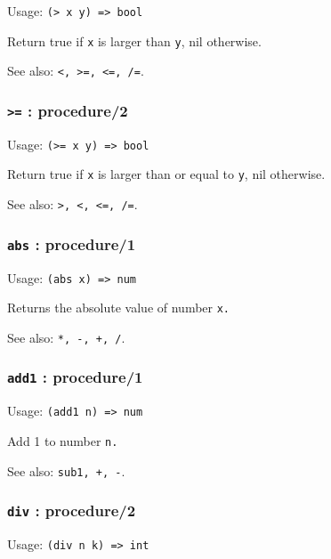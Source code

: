 \documentclass[
]{article}
\newcommand{\passthrough}[1]{#1}
\begin{document}
Usage: \passthrough{\lstinline!(> x y) => bool!}

Return true if \passthrough{\lstinline!x!} is larger than
\passthrough{\lstinline!y!}, nil otherwise.

See also: \passthrough{\lstinline!<, >=, <=, /=!}.

\hypertarget{procedure2-6}{%
\subsubsection{\texorpdfstring{\texttt{\textgreater{}=} :
procedure/2}{\textgreater= : procedure/2}}\label{procedure2-6}}

Usage: \passthrough{\lstinline!(>= x y) => bool!}

Return true if \passthrough{\lstinline!x!} is larger than or equal to
\passthrough{\lstinline!y!}, nil otherwise.

See also: \passthrough{\lstinline!>, <, <=, /=!}.

\hypertarget{abs-procedure1}{%
\subsubsection{\texorpdfstring{\texttt{abs} :
procedure/1}{abs : procedure/1}}\label{abs-procedure1}}

Usage: \passthrough{\lstinline!(abs x) => num!}

Returns the absolute value of number \passthrough{\lstinline!x.!}

See also: \passthrough{\lstinline!*, -, +, /!}.

\hypertarget{add1-procedure1}{%
\subsubsection{\texorpdfstring{\texttt{add1} :
procedure/1}{add1 : procedure/1}}\label{add1-procedure1}}

Usage: \passthrough{\lstinline!(add1 n) => num!}

Add 1 to number \passthrough{\lstinline!n.!}

See also: \passthrough{\lstinline!sub1, +, -!}.

\hypertarget{div-procedure2}{%
\subsubsection{\texorpdfstring{\texttt{div} :
procedure/2}{div : procedure/2}}\label{div-procedure2}}

Usage: \passthrough{\lstinline!(div n k) => int!}
\end{document}
